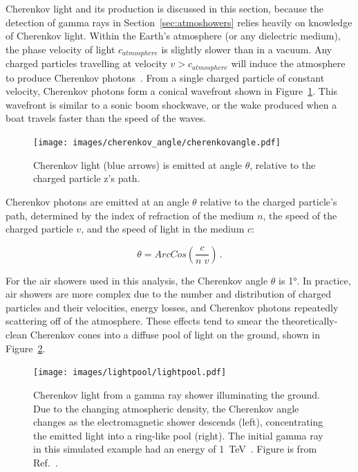   Cherenkov light and its production is discussed in this section, because the detection of gamma rays in Section~\ref{sec:atmoshowers} relies heavily on knowledge of Cherenkov light.
  Within the Earth's atmosphere (or any dielectric medium), the phase velocity of light $c_{atmosphere}$ is slightly slower than in a vacuum.
  Any charged particles travelling at velocity $v > c_{atmosphere}$ will induce the atmosphere to produce Cherenkov photons~\cite{cherenkov}.
  From a single charged particle of constant velocity, Cherenkov photons form a conical wavefront shown in Figure~\ref{fig:cherenkovangle}.
  This wavefront is similar to a sonic boom shockwave, or the wake produced when a boat travels faster than the speed of the waves.

  \begin{figure}[!t]
    \centering
    \texttt{[image: images/cherenkov\_angle/cherenkovangle.pdf]}
    \caption[Cherenkov Emission Angle]{
      Cherenkov light (blue arrows) is emitted at angle $\theta$, relative to the charged particle z's path.
    }
    \label{fig:cherenkovangle}
  \end{figure}

  Cherenkov photons are emitted at an angle $\theta$ relative to the charged particle's path, determined by the index of refraction of the medium $n$, the speed of the charged particle $v$, and the speed of light in the medium $c$:

  \begin{equation}\label{eqn:cherenkovangle}
    \theta = ArcCos \left ( \frac{c}{n \; v} \right ) \,.
  \end{equation}
  
  For the air showers used in this analysis, the Cherenkov angle $\theta$ is \nicetilde\ang{1}.
  In practice, air showers are more complex due to the number and distribution of charged particles and their velocities, energy losses, and Cherenkov photons repeatedly scattering off of the atmosphere.
  These effects tend to smear the theoretically-clean Cherenkov cones into a diffuse pool of light on the ground, shown in Figure~\ref{fig:lightpool}.

  \begin{figure}[!t]
    \centering
    \texttt{[image: images/lightpool/lightpool.pdf]}
    \caption[Cherenkov Light Pool]{
      Cherenkov light from a gamma ray shower illuminating the ground.
      Due to the changing atmospheric density, the Cherenkov angle changes as the electromagnetic shower descends (left), concentrating the emitted light into a ring-like pool (right).
      The initial gamma ray in this simulated example had an energy of \SI{1}{\TeV{}}.
      Figure is from Ref.~\cite{Voelk}.
    }
    \label{fig:lightpool}
  \end{figure}
  

